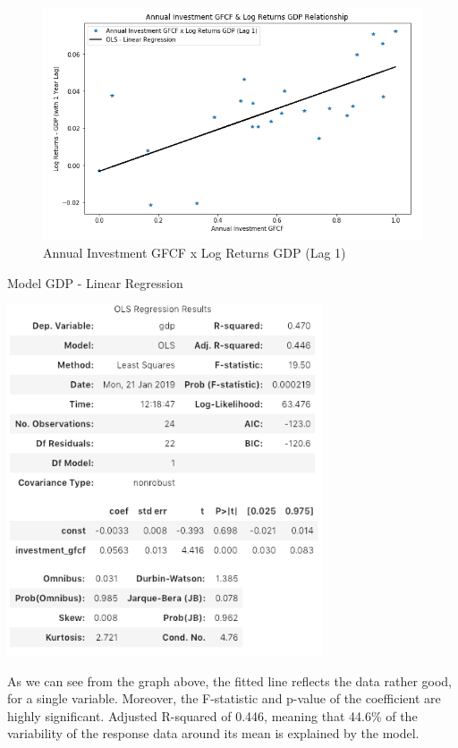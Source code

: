 \documentclass{elsarticle}
\begin{document}
\begin{figure}[H]
    \centering
    \includegraphics[width=1\textwidth]{images/scatter_1.png}
    \caption{Annual Investment GFCF x Log Returns GDP (Lag 1)}
    \label{fig:Annual Investment GFCF x Log Returns GDP (Lag 1)}
\end{figure}

\begin{table}[H]
  \centering
  \caption{Model GDP - Linear Regression}
  \includegraphics[width=0.7\textwidth]{images/ols_1.png}
\end{table}

As we can see from the graph above, the fitted line reflects the data rather good, for a single variable.
Moreover, the F-statistic and p-value of the coefficient are highly significant. Adjusted R-squared of 0.446, meaning that 44.6\% of the variability of the response data around its mean is explained by the model.
\end{document}
